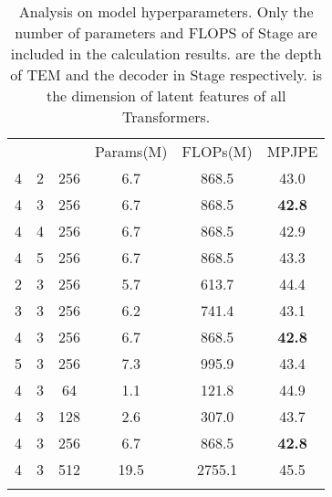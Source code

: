 \documentclass[]{llncs}
\newcommand{\RNum}[1]{\uppercase\expandafter{\romannumeral #1\relax}}
\begin{document}
\begin{table}[t]\small
\begin{center}
\caption{Analysis on model hyperparameters. Only the number of parameters and FLOPS of Stage \RNum{2} are included in the calculation results.  are the depth of TEM and the decoder in Stage \RNum{1} respectively.  is the dimension of latent features of all Transformers.}
\vspace{-0.1cm}
\label{tab:hyperparam}
\begin{tabular}{ccc@{\hskip 0.1in}|@{\hskip 0.1in}ccc}
\hline\noalign{\smallskip}
&&&Params(M)&FLOPs(M)&MPJPE\\
\noalign{\smallskip}
\hline
\noalign{\smallskip}
4&2&256&6.7&868.5&43.0\\
4&3&256&6.7&868.5&\textbf{42.8}\\
4&4&256&6.7&868.5&42.9\\
4&5&256&6.7&868.5&43.3\\
\noalign{\smallskip}
\hline
\noalign{\smallskip}
2&3&256&5.7&613.7&44.4\\
3&3&256&6.2&741.4&43.1\\
4&3&256&6.7&868.5&\textbf{42.8}\\
5&3&256&7.3&995.9&43.4\\
\noalign{\smallskip}
\hline
\noalign{\smallskip}
4&3&64&1.1&121.8&44.9\\
4&3&128&2.6&307.0&43.7\\
4&3&256&6.7&868.5&\textbf{42.8}\\
4&3&512&19.5&2755.1&45.5\\
\noalign{\smallskip}
\hline
\end{tabular}
\end{center}
\vspace{-0.6cm}
\end{table}
\end{document}
